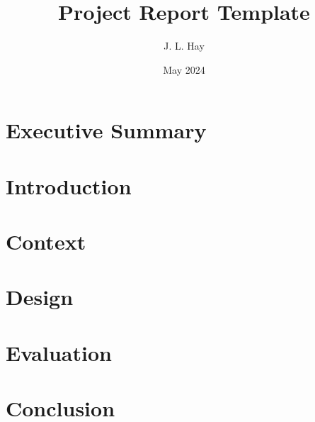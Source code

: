 \documentclass{article}
\title{Project Report Template}
\author{J. L. Hay \cite{hay22}}
\date{May 2024}
\begin{document}
\maketitle
\thispagestyle{empty}

\pagebreak



\section*{Executive Summary}


\pagebreak


\tableofcontents

\pagebreak


\fancyfoot[R]{\thepage/\pageref*{page:final}} %

\section{Introduction}


\pagebreak


\section{Context}


\pagebreak


\section{Design}


\pagebreak


\section{Evaluation}


\pagebreak


\section*{Conclusion}
\label{page:final}


\pagebreak


\fancyfoot[R]{\thepage}

\printbibliography
{}

\pagebreak

\appendix

\end{document}
